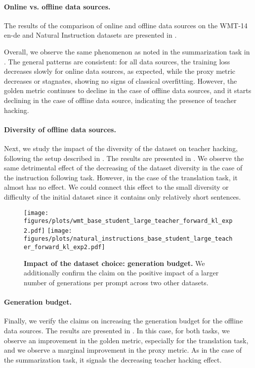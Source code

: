 \paragraph{Online vs. offline data sources.}
The results of the comparison of online and offline data sources on the WMT-14 en-de and Natural Instruction datasets are presented in . 

Overall, we observe the same phenomenon as noted in the summarization task in . The general patterns are consistent: for all data sources, the training loss decreases slowly for online data sources, as expected, while the proxy metric decreases or stagnates, showing no signs of classical overfitting. However, the golden metric continues to decline in the case of offline data sources, and it starts declining in the case of offline data source, indicating the presence of teacher hacking.


\paragraph{Diversity of offline data sources.}

Next, we study the impact of the diversity of the dataset on teacher hacking, following the setup described in . The results are presented in . We observe the same detrimental effect of the decreasing of the dataset diversity in the case of the instruction following task. However, in the case of the translation task, it almost has no effect. We could connect this effect to the small diversity or difficulty of the initial dataset since it contains only relatively short sentences.

\begin{figure}[ht]
    \centering
    \texttt{[image: figures/plots/wmt\_base\_student\_large\_teacher\_forward\_kl\_exp2.pdf]}
    \texttt{[image: figures/plots/natural\_instructions\_base\_student\_large\_teacher\_forward\_kl\_exp2.pdf]}
    \caption{\textbf{Impact of the dataset choice: generation budget.} 
    We additionally confirm the claim on the positive impact of a larger number of generations per prompt across two other datasets.
    }
    \label{fig:datasets_exp_large_to_base_gen_fwd_kl}
\end{figure}

\paragraph{Generation budget.} Finally, we verify the claims on increasing the generation budget for the offline data sources. The results are presented in . In this case, for both tasks, we observe an improvement in the golden metric, especially for the translation task, and we observe a marginal improvement in the proxy metric. As in the case of the summarization task, it signals the decreasing teacher hacking effect.


